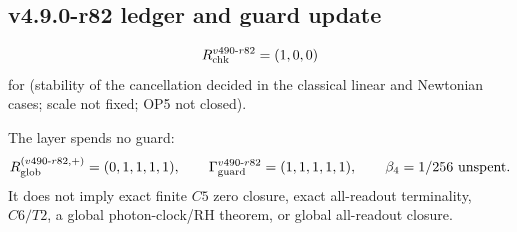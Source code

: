 \subsection*{v4.9.0-r82 ledger and guard update}
\label{subsec:v490-r82-ledger-guard}

\[
R_{\rm chk}^{v490\text{-}r82}=(1,0,0)
\]
for (stability of the cancellation decided in the classical linear and Newtonian cases; scale not fixed; OP5 not closed).

The layer spends no guard:
\[
R_{\rm glob}^{(v490\text{-}r82,+)}=(0,1,1,1,1),
\qquad
\Gamma_{\rm guard}^{v490\text{-}r82}=(1,1,1,1,1),
\qquad
\beta_4=1/256\ \text{unspent}.
\]
It does not imply exact finite \(C5\) zero closure, exact all-readout terminality,
\(C6/T2\), a global photon-clock/RH theorem, or global all-readout closure.
